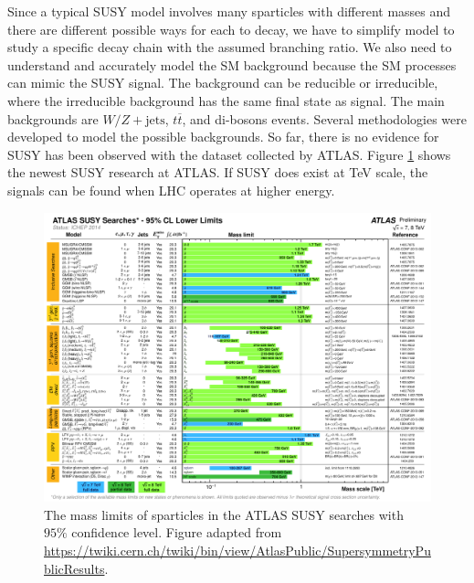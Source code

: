 \documentclass[12pt]{report}
\begin{document}
Since a typical SUSY model involves many sparticles with different masses and there are different possible ways for each to decay, we have to simplify model to study a specific decay chain with the assumed branching ratio.
We also need to understand and accurately model the SM background because the SM processes can mimic the SUSY signal.
The background can be reducible or irreducible, where the irreducible background has the same final state as signal.
The main backgrounds are $W/Z + \mathrm{jets}$, $t \overline{t}$, and di-bosons events.
Several methodologies were developed to model the possible backgrounds.
So far, there is no evidence for SUSY has been observed with the dataset collected by ATLAS.
Figure \ref{fig: ATLAS_SUSY_Summary} shows the newest SUSY research at ATLAS.
If SUSY does exist at TeV scale, the signals can be found when LHC operates at higher energy.
\begin{figure}[htbp]
\begin{center}
\includegraphics[scale=0.6]{figures/ATLAS_SUSY_Summary.pdf}
\caption{The mass limits of sparticles in the ATLAS SUSY searches with $95\%$ confidence level. Figure adapted from \url{https://twiki.cern.ch/twiki/bin/view/AtlasPublic/SupersymmetryPublicResults}.}
\label{fig: ATLAS_SUSY_Summary}
\end{center}
\end{figure}
\end{document}
